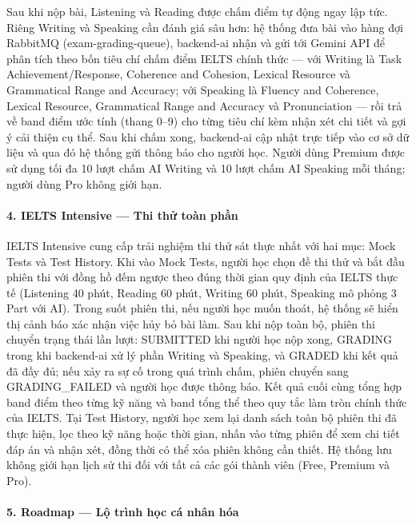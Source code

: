 Sau khi nộp bài, Listening và Reading được chấm điểm tự động ngay lập tức. Riêng Writing và Speaking cần đánh giá sâu hơn: hệ thống đưa bài vào hàng đợi RabbitMQ (exam-grading-queue), backend-ai nhận và gửi tới Gemini API để phân tích theo bốn tiêu chí chấm điểm IELTS chính thức --- với Writing là Task Achievement/Response, Coherence and Cohesion, Lexical Resource và Grammatical Range and Accuracy; với Speaking là Fluency and Coherence, Lexical Resource, Grammatical Range and Accuracy và Pronunciation --- rồi trả về band điểm ước tính (thang 0--9) cho từng tiêu chí kèm nhận xét chi tiết và gợi ý cải thiện cụ thể. Sau khi chấm xong, backend-ai cập nhật trực tiếp vào cơ sở dữ liệu và qua đó hệ thống gửi thông báo cho người học. Người dùng Premium được sử dụng tối đa 10 lượt chấm AI Writing và 10 lượt chấm AI Speaking mỗi tháng; người dùng Pro không giới hạn.

\paragraph{4. IELTS Intensive --- Thi thử toàn phần}

IELTS Intensive cung cấp trải nghiệm thi thử sát thực nhất với hai mục: Mock Tests và Test History. Khi vào Mock Tests, người học chọn đề thi thử và bắt đầu phiên thi với đồng hồ đếm ngược theo đúng thời gian quy định của IELTS thực tế (Listening 40 phút, Reading 60 phút, Writing 60 phút, Speaking mô phỏng 3 Part với AI). Trong suốt phiên thi, nếu người học muốn thoát, hệ thống sẽ hiển thị cảnh báo xác nhận việc hủy bỏ bài làm. Sau khi nộp toàn bộ, phiên thi chuyển trạng thái lần lượt: SUBMITTED khi người học nộp xong, GRADING trong khi backend-ai xử lý phần Writing và Speaking, và GRADED khi kết quả đã đầy đủ; nếu xảy ra sự cố trong quá trình chấm, phiên chuyển sang GRADING\_FAILED và người học được thông báo. Kết quả cuối cùng tổng hợp band điểm theo từng kỹ năng và band tổng thể theo quy tắc làm tròn chính thức của IELTS. Tại Test History, người học xem lại danh sách toàn bộ phiên thi đã thực hiện, lọc theo kỹ năng hoặc thời gian, nhấn vào từng phiên để xem chi tiết đáp án và nhận xét, đồng thời có thể xóa phiên không cần thiết. Hệ thống lưu không giới hạn lịch sử thi đối với tất cả các gói thành viên (Free, Premium và Pro).

\paragraph{5. Roadmap --- Lộ trình học cá nhân hóa}

